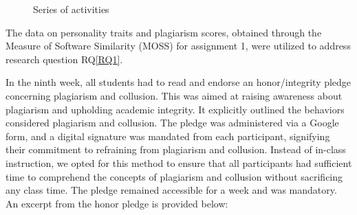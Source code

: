 \begin{figure}[H]
  \centering
  \vspace{-8pt}
  \caption{Series of activities}
  \label{fig:activityTimeline} \vspace{-10pt}
\end{figure}

 The data on personality traits and plagiarism scores, obtained through the Measure of Software Similarity (MOSS) for assignment 1, were utilized to address research question RQ\ref{RQ1}.

In the ninth week, all students had to read and endorse an honor/integrity pledge concerning plagiarism and collusion. This was aimed at raising awareness about plagiarism and upholding academic integrity. It explicitly outlined the behaviors considered plagiarism and collusion. The pledge was administered via a Google form, and a digital signature was mandated from each participant, signifying their commitment to refraining from plagiarism and collusion. Instead of in-class instruction, we opted for this method to ensure that all participants had sufficient time to comprehend the concepts of plagiarism and collusion without sacrificing any class time. The pledge remained accessible for a week and was mandatory. An excerpt from the honor pledge is provided below:

